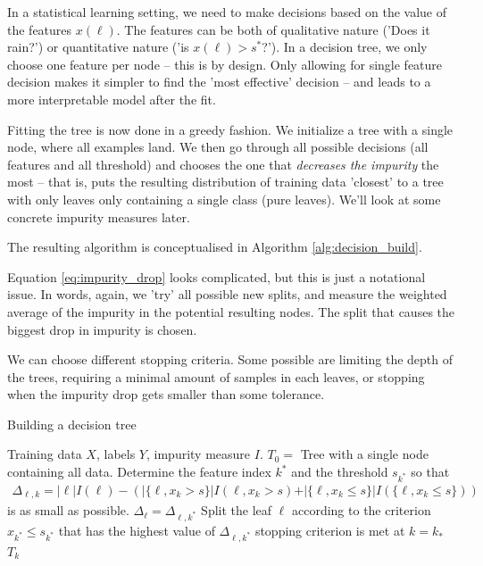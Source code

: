 \documentclass{article}
\newcommand{\abs}[1]{\vert #1 \vert}
\begin{document}
In a statistical  learning setting, we need to make decisions based on the value of the features $x(\ell)$. The features can be both of qualitative nature ('Does it rain?') or quantitative nature ('is $x(\ell)>s^*$?').  In a decision tree, we only choose one feature per node -- this is by design. Only allowing for single feature decision makes it simpler to find the 'most effective' decision -- and leads to a more interpretable model after the fit. 

Fitting the tree is now done in a greedy fashion. We initialize a tree with a single node, where all examples land. We then go through all possible decisions (all features and all threshold) and chooses the one that \emph{decreases the impurity} the most -- that is, puts the resulting distribution of training data 'closest' to a tree with only leaves only containing a single class (pure leaves). We'll look at some concrete impurity measures later.


The resulting algorithm is conceptualised in Algorithm \ref{alg:decision_build}.

Equation \eqref{eq:impurity_drop} looks complicated, but this is just a notational issue. In words, again, we 'try' all possible new splits, and measure the weighted average of the impurity in the potential resulting nodes. The split that causes the biggest drop in impurity is chosen.

We can choose different stopping criteria. Some possible are limiting the depth of the trees, requiring a minimal amount of samples in each leaves, or stopping when the impurity drop gets smaller than some tolerance.

\begin{algorithm}[tb]      
	\caption{Building a decision tree} 
	\begin{algorithmic} [1]
 		\REQUIRE Training data $X$, labels $Y$, impurity measure $I$.\label{alg:decision_build}
 		\STATE $T_0=$ Tree with a single node containing all data.
 		\REPEAT
                \STATE Determine the feature index $k^*$ and the threshold $s_{k^*}$ so that
                \begin{align}
                    \Delta_{\ell,k} = \abs{\ell} I(\ell)  - \left(\abs{\{\ell, x_k>s\}} I(\ell, x_k>s) + \abs{\{\ell, x_k\leq s\}} I(\{\ell, x_k\leq s\})\right) \label{eq:impurity_drop}
                \end{align}
                is as small as possible.
                \STATE $\Delta_\ell = \Delta_{\ell,k^*}$
            \ENDFOR
            \STATE Split the leaf $\ell$ according to the criterion $x_{k^*}\leq s_{k^*}$ that has the highest value of $\Delta_{\ell,k^*}$
 		\UNTIL stopping criterion is met at $k= k_*$
 		\RETURN $T_k$
	\end{algorithmic}
\end{algorithm}
\end{document}
